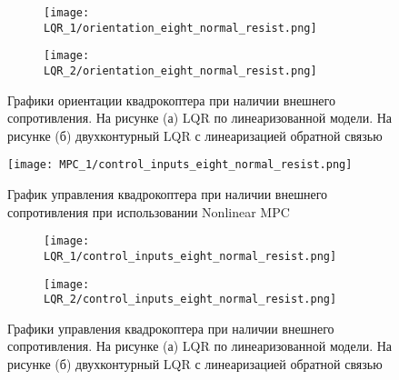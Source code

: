 \begin{figure}[ht]
	\centering
\hspace*{\fill}%
	\begin{subfigure}[b]{0.49\textwidth}
        \centering
		\texttt{[image: LQR\_1/orientation\_eight\_normal\_resist.png]}
		\caption{}
		\label{fig:tiger1}
	\end{subfigure}
\hfill
	\begin{subfigure}[b]{0.49\textwidth}
        \centering
		\texttt{[image: LQR\_2/orientation\_eight\_normal\_resist.png]}
        \caption{}
		\label{fig:tiger2}
	\end{subfigure}
\hspace*{\fill}%
	\caption{Графики ориентации квадрокоптера при наличии внешнего сопротивления. На рисунке (а) LQR по линеаризованной модели. На рисунке (б) двухконтурный LQR с линеаризацией обратной связью}
	\label{fig:tiger}
\end{figure}

\newpage

\begin{figure}[ht]
    \centering
    \texttt{[image: MPC\_1/control\_inputs\_eight\_normal\_resist.png]}
    \caption{График управления квадрокоптера при наличии внешнего сопротивления при использовании Nonlinear MPC}
    \label{}
\end{figure}

\begin{figure}[ht]
	\centering
\hspace*{\fill}%
	\begin{subfigure}[b]{0.49\textwidth}
        \centering
		\texttt{[image: LQR\_1/control\_inputs\_eight\_normal\_resist.png]}
		\caption{}
		\label{fig:tiger1}
	\end{subfigure}
\hfill
	\begin{subfigure}[b]{0.49\textwidth}
        \centering
		\texttt{[image: LQR\_2/control\_inputs\_eight\_normal\_resist.png]}
        \caption{}
		\label{fig:tiger2}
	\end{subfigure}
\hspace*{\fill}%
	\caption{Графики управления квадрокоптера при наличии внешнего сопротивления. На рисунке (а) LQR по линеаризованной модели. На рисунке (б) двухконтурный LQR с линеаризацией обратной связью}
	\label{fig:tiger}
\end{figure}



